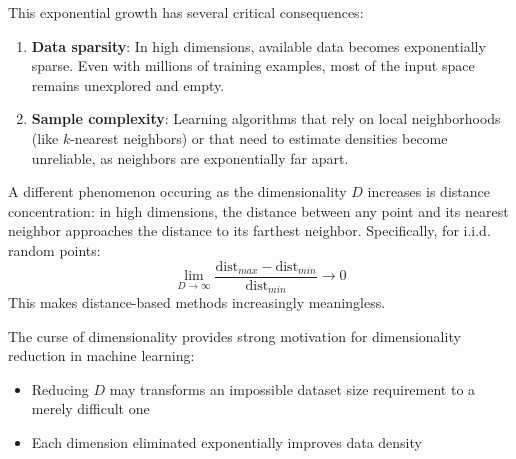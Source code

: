 This exponential growth has several critical consequences:

\begin{enumerate}
    \item \textbf{Data sparsity}: In high dimensions, available data becomes exponentially sparse. Even with millions of training examples, most of the input space remains unexplored and empty.
    
    \item \textbf{Sample complexity}: Learning algorithms that rely on local neighborhoods (like $k$-nearest neighbors) or that need to estimate densities become unreliable, as neighbors are exponentially far apart.
    
\end{enumerate}

A different phenomenon occuring as the dimensionality $D$ increases is  \alert{distance concentration}: in high dimensions, the distance between any point and its nearest neighbor approaches the distance to its farthest neighbor. Specifically, for i.i.d. random points:
    $$
    \lim_{D \to \infty} \frac{\text{dist}_{max} - \text{dist}_{min}}{\text{dist}_{min}} \to 0
    $$
    This makes distance-based methods increasingly meaningless.



The curse of dimensionality provides strong motivation for dimensionality reduction in machine learning:
\begin{itemize}
    \item Reducing $D$ may transforms an impossible dataset size requirement to a merely difficult one %
    \item Each dimension eliminated exponentially improves data density%
\end{itemize}

